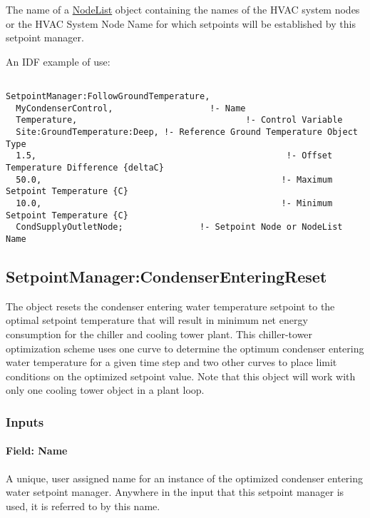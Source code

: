 The name of a \hyperref[nodelist]{NodeList} object containing the names of the HVAC system nodes or the HVAC System Node Name for which setpoints will be established by this setpoint manager.

An IDF example of use:

\begin{lstlisting}

SetpointManager:FollowGroundTemperature,
  MyCondenserControl,                   !- Name
  Temperature,                                 !- Control Variable
  Site:GroundTemperature:Deep, !- Reference Ground Temperature Object Type
  1.5,                                                 !- Offset Temperature Difference {deltaC}
  50.0,                                               !- Maximum Setpoint Temperature {C}
  10.0,                                               !- Minimum Setpoint Temperature {C}
  CondSupplyOutletNode;               !- Setpoint Node or NodeList Name
\end{lstlisting}

\subsection{SetpointManager:CondenserEnteringReset}\label{setpointmanagercondenserenteringreset}

The object resets the condenser entering water temperature setpoint to the optimal setpoint temperature that will result in minimum net energy consumption for the chiller and cooling tower plant. This chiller-tower optimization scheme uses one curve to determine the optimum condenser entering water temperature for a given time step and two other curves to place limit conditions on the optimized setpoint value. Note that this object will work with only one cooling tower object in a plant loop.

\subsubsection{Inputs}\label{inputs-23-004}

\paragraph{Field: Name}\label{field-name-23-002}

A unique, user assigned name for an instance of the optimized condenser entering water setpoint manager. Anywhere in the input that this setpoint manager is used, it is referred to by this name.

